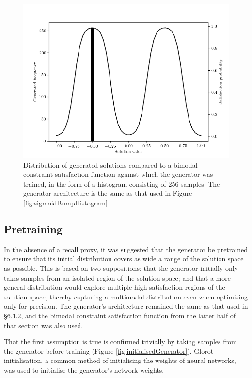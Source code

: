 \documentclass[../../main.tex]{subfiles}
\begin{document}
\begin{figure}
    \begin{center}
    \includegraphics[width=\textwidth]{sigmoidBumpHistogramBimodal}
    \caption{
        Distribution of generated solutions compared to a bimodal constraint satisfaction function against which the generator was trained, in the form of a histogram consisting of 256 samples.
        The generator architecture is the same as that used in Figure \ref{fig:sigmoidBumpHistogram}.
    }
    \label{fig:sigmoidBumpHistogramBimodal}
    \end{center}
\end{figure}

\subsection{Pretraining}

In the absence of a recall proxy, it was suggested that the generator be pretrained to ensure that its initial distribution covers as wide a range of the solution space as possible.
This is based on two suppositions: that the generator initially only takes samples from an isolated region of the solution space; and that a more general distribution would explore multiple high-satisfaction regions of the solution space, thereby capturing a multimodal distribution even when optimising only for precision.
The generator's architecture remained the same as that used in \S 6.1.2, and the bimodal constraint satisfaction function from the latter half of that section was also used.

That the first assumption is true is confirmed trivially by taking samples from the generator before training (Figure \ref{fig:initialisedGenerator}).
Glorot initialisation, a common method of initialising the weights of neural networks, was used to initialise the generator's network weights.
\end{document}
